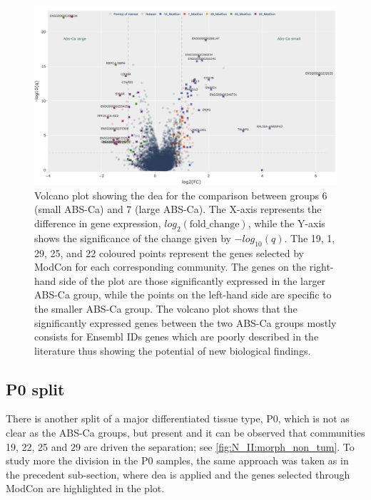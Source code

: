 \begin{figure}   
    \centering
    \includegraphics[width=1.0\textwidth,height=1.0\textheight,keepaspectratio]{Sections/Network_II/resources/non_tum/diff_split_dea.png}
    \caption[Volcano plot - ABS-Ca splits comparison]{Volcano plot showing the \acrlong{dea} for the comparison between groups 6 (small ABS-Ca) and 7 (large ABS-Ca). The X-axis represents the difference in gene expression, $log_2(\text{fold\_change})$, while the Y-axis shows the significance of the change given by $-log_{10}(q)$. The 19, 1, 29, 25, and 22 coloured points represent the genes selected by ModCon for each corresponding community. The genes on the right-hand side of the plot are those significantly expressed in the larger ABS-Ca group, while the points on the left-hand side are specific to the smaller ABS-Ca group. The volcano plot shows that the significantly expressed genes between the two ABS-Ca groups mostly consists for Ensembl IDs genes which are poorly described in the literature thus showing the potential of new biological findings.}
    \label{fig:N_II:diff_split}
\end{figure}


\subsection{P0 split} \label{s:N_II:p0_split}

There is another split of a major differentiated tissue type, P0,  which is not as clear as the ABS-Ca groups, but present and it can be observed that communities 19, 22, 25 and 29 are driven the separation; see \cref{fig:N_II:morph_non_tum}. To study more the division in the P0 samples, the same approach was taken as in the precedent sub-section, where \acrshort{dea} is applied and the genes selected through ModCon are highlighted in the plot.

